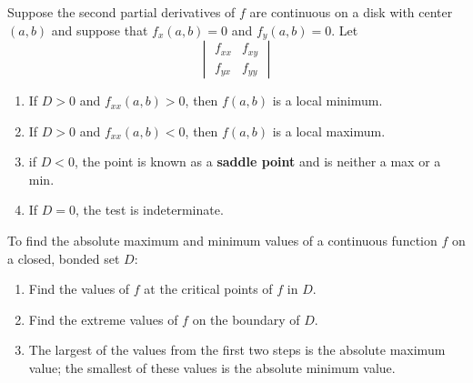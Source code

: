 Suppose the second partial derivatives of $f$ are continuous on a disk with center $(a,b)$ and suppose that $f_x(a,b) = 0$ and $f_y(a,b) = 0$. Let 
$$\begin{vmatrix}
    f_{xx}&f_{xy}\\f_{yx}&f_{yy}
\end{vmatrix}$$
\begin{enumerate}[a]
    \item If $D > 0$ and $f_{xx}(a,b) > 0$, then $f(a,b)$ is a local minimum.
    \item If $D > 0$ and $f_{xx}(a,b) < 0$, then $f(a,b)$ is a local maximum.
    \item if $D < 0$, the point is known as a \textbf{saddle point} and is neither a max or a min.
    \item If $D = 0$, the test is indeterminate. 
\end{enumerate}
To find the absolute maximum and minimum values of a continuous function $f$ on a closed, bonded set $D$:
\begin{enumerate}
    \item Find the values of $f$ at the critical points of $f$ in $D$.
    \item Find the extreme values of $f$ on the boundary of $D$.
    \item The largest of the values from the first two steps is the absolute maximum value; the smallest of these values is the absolute minimum value.
\end{enumerate}

